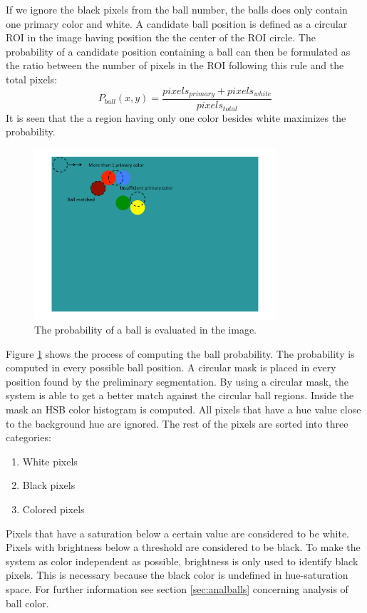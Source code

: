 If we ignore the black pixels from the ball number, the balls does only contain one primary color and white. A candidate ball position is defined as a circular ROI in the image having position the the center of the ROI circle.
The probability of a candidate position containing a ball can then be formulated as the ratio between the number of pixels in the ROI following this rule and the total pixels:
\begin{equation}
P_{ball}(x,y) = \frac{pixels_{primary} + pixels_{white}}{pixels_{total}}
\end{equation}
It is seen that the a region having only one color besides white maximizes the probability.
\begin{figure}[H]
\begin{center}
\includegraphics[width=0.8\textwidth]{images/ballfind.pdf}
\caption{The probability of a ball is evaluated in the image.}
\label{fig:ballfind}
\end{center}
\end{figure}
Figure \ref{fig:ballfind} shows the process of computing the ball probability. The probability is computed in every possible ball position.
A circular mask is placed in every position found by the preliminary segmentation. By using a circular mask, the system is able to get a better match against the circular ball regions. Inside the mask an HSB color histogram is computed. All pixels that have a hue value close to the background hue are ignored. The rest of the pixels are sorted into three categories: 
\begin{enumerate}
  \item White pixels
  \item Black pixels
  \item Colored pixels
\end{enumerate}
Pixels that have a saturation below a certain value are considered to be white. Pixels with brightness below a threshold are considered to be black. To make the system as color independent as possible, brightness is only used to identify black pixels. This is necessary because the black color is undefined in hue-saturation space. For further information see section \ref{sec:analballs} concerning analysis of ball color.

